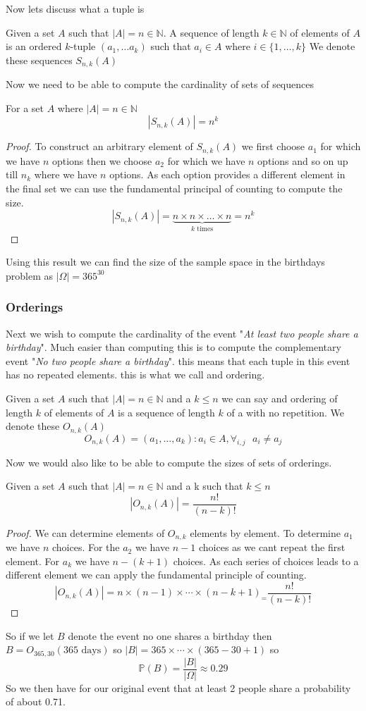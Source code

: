 \documentclass{article}
\begin{document}
Now lets discuss what a tuple is
\begin{definition}
    Given a set $A$ such that $|A| = n \in \mathbb{N}$. A sequence of length $k \in \mathbb{N}$ of elements of $A$ is an ordered $k$-tuple $(a_1,\dots a_k)$ such that $a_i \in A$ where $i \in \{1,\dots,k\}$   
    We denote these sequences $S_{n,k}(A)$
\end{definition}
Now we need to be able to compute the cardinality of sets of sequences
\begin{proposition}
    For a set $A$ where $|A| = n \in \mathbb{N}$
    \[|S_{n,k}(A)| = n^k\]
\end{proposition}
\begin{proof}
    To construct an arbitrary element of $S_{n,k}(A)$ we first choose $a_1$ for which we have $n$ options then we choose $a_2$ for which we have $n$ options and so on up till $n_k$ where we have $n$ options. As each option provides a different element in the final set we can use the fundamental principal of counting to compute the size. 
    \[|S_{n,k}(A)| = \underbrace{n\times n \times \dots \times n}_{k \text{ times}} = n^k\]
\end{proof}
Using this result we can find the size of the sample space in the birthdays problem as $|\Omega| = 365 ^ {30}$ 
\subsubsection{Orderings}
Next we wish to compute the cardinality of the event "\textit{At least two people share a birthday}". Much easier than computing this is to compute the complementary event "\textit{No two people share a birthday}". this means that each tuple in this event has no repeated elements. this is what we call and ordering.
\begin{definition}
    Given a set $A$ such that $|A| = n \in \mathbb{N}$ and a $k \le n$ we can say and ordering of length $k$ of elements of $A$ is a sequence of length $k$ of a with no repetition. We denote these $O_{n,k}(A)$
    \[O_{n,k}(A) = (a_1,\dots,a_k) : a_i \in A,\forall_{i,j}\text{ }a_i \ne a_j\]
\end{definition}
Now we would also like to be able to compute the sizes of sets of orderings.
\begin{proposition}
    Given a set $A$ such that $|A| = n \in \mathbb{N}$ and a k such that $k \le n$
    \[|O_{n,k}(A)| = \frac{n!}{(n-k)!}\]
\end{proposition}
\begin{proof}
    We can determine elements of $O_{n,k}$ elements by element. To determine $a_1$ we have $n$ choices. For the $a_2$ we have $n-1$ choices as we cant repeat the first element. For $a_k$ we have $n - (k+1)$ choices. As each series of choices leads to a different element we can apply the fundamental principle of counting.
    \[|O_{n,k}(A)| =n \times (n-1) \times \cdots \times (n - k +1)_= \frac{n!}{(n-k)!}\]
\end{proof}
So if we let $B$ denote the event no one shares a birthday then
$B = O_{365,30}(\text{365 days})$ so $|B| = 365 \times \cdots \times (365 - 30 + 1)$ so 
\[\mathbb{P}(B) = \frac{|B|}{|\Omega|} \approx 0.29\]
So we then have for our original event that at least 2 people share a probability of about 0.71.
\end{document}
